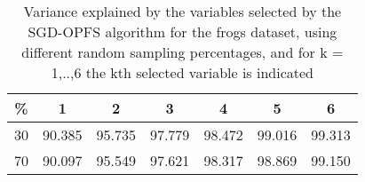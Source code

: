 \begin{table}
	\begin{center}
		\begin{tabular}{c c c c c c c}
			\% & 1 & 2 & 3 & 4 & 5 & 6 \\
			\hline
			30 & 90.385 & 95.735 & 97.779 & 98.472 & 99.016 & 99.313 \\
			70 & 90.097 & 95.549 & 97.621 & 98.317 & 98.869 & 99.150 \\
		\end{tabular}
	\end{center}
	\caption{Variance explained by the variables selected by the SGD-OPFS algorithm for the frogs dataset, using different random sampling percentages, and for k = 1,..,6 the kth selected variable is indicated}
\end{table}